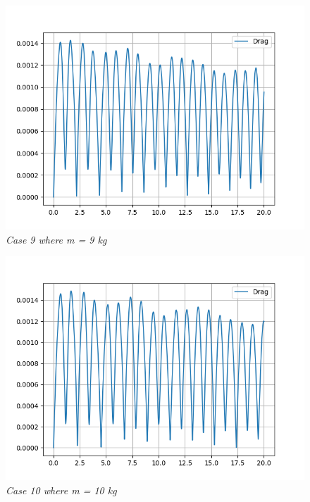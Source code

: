     \begin{figure}[H]
        \centering
        \includegraphics{Appendix/Derived Data Pictures/dm9.png}
        \caption{\textit{Case 9 where m = 9 kg}}
        \label{}
    \end{figure}
            
    \begin{figure}[H]
        \centering
        \includegraphics{Appendix/Derived Data Pictures/dm10.png}
        \caption{\textit{Case 10 where m = 10 kg}}
        \label{}
    \end{figure}
            
            

